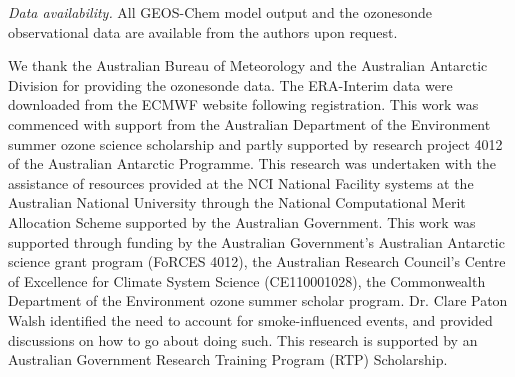 \documentclass[acp, manuscript]{copernicus} %
\begin{document}


%
\textit{Data availability.} All GEOS-Chem model output and the ozonesonde observational data are available from the authors upon request.

\begin{acknowledgements}
We thank the Australian Bureau of Meteorology and the Australian Antarctic Division for providing the ozonesonde data. 
The ERA-Interim data were downloaded from the ECMWF website following registration.
This work was commenced with support from the Australian Department of the Environment summer ozone science scholarship and partly supported by research project 4012 of the Australian Antarctic Programme.
This research was undertaken with the assistance of resources provided at the NCI National Facility systems at the Australian National University through the National Computational Merit Allocation Scheme supported by the Australian Government.
This work was supported through funding by the Australian Government's Australian Antarctic science grant program (FoRCES 4012), the Australian Research Council's Centre of Excellence for Climate System Science (CE110001028), the Commonwealth Department of the Environment ozone summer scholar program.
Dr. Clare Paton Walsh identified the need to account for smoke-influenced events, and provided discussions on how to go about doing such.
This research is supported by an Australian Government Research Training Program (RTP) Scholarship.
\end{acknowledgements}





\end{document}
